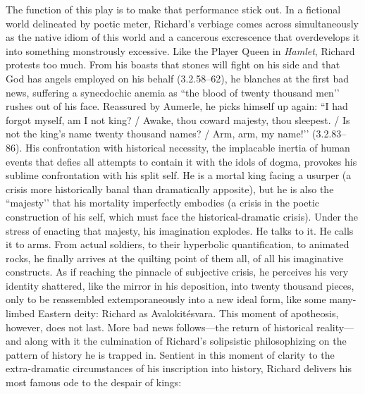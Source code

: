 The function of this play is to make that performance stick out.
In a fictional world delineated by poetic meter, Richard’s verbiage comes across simultaneously as the native idiom of this world and a cancerous excrescence that overdevelops it into something monstrously excessive.
Like the Player Queen in \emph{Hamlet}, Richard protests too much.
From his boasts that stones will fight on his side and that God has angels employed on his behalf (3.2.58--62), he blanches at the first bad news, suffering a synecdochic anemia as ``the blood of twenty thousand men’’ rushes out of his face.
Reassured by Aumerle, he picks himself up again: ``I had forgot myself, am I not king? / Awake, thou coward majesty, thou sleepest.
/ Is not the king’s name twenty thousand names? / Arm, arm, my name!’’ (3.2.83--86).
His confrontation with historical necessity, the implacable inertia of human events that defies all attempts to contain it with the idols of dogma, provokes his sublime confrontation with his split self.
He is a mortal king facing a usurper (a crisis more historically banal than dramatically apposite), but he is also the ``majesty’’ that his mortality imperfectly embodies (a crisis in the poetic construction of his self, which must face the historical-dramatic crisis).
Under the stress of enacting that majesty, his imagination explodes.
He talks to it.
He calls it to arms.
From actual soldiers, to their hyperbolic quantification, to animated rocks, he finally arrives at the quilting point of them all, of all his imaginative constructs.
As if reaching the pinnacle of subjective crisis, he perceives his very identity shattered, like the mirror in his deposition, into twenty thousand pieces, only to be reassembled extemporaneously into a new ideal form, like some many-limbed Eastern deity: Richard as Avalokitésvara.
This moment of apotheosis, however, does not last.
More bad news follows---the return of historical reality---and along with it the culmination of Richard’s solipsistic philosophizing on the pattern of history he is trapped in.
Sentient in this moment of clarity to the extra-dramatic circumstances of his inscription into history, Richard delivers his most famous ode to the despair of kings: 
